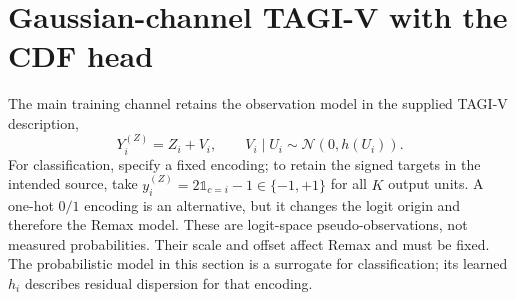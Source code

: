 \documentclass[letterpaper]{article}
\newcommand{\Normal}{\mathcal N}
\newcommand{\ind}{\mathbb 1}
\newcommand{\given}{\mid}
\begin{document}
\section{Gaussian-channel TAGI-V with the CDF head}\label{S:gaussian}
The main training channel retains the observation model in the supplied TAGI-V description,
\begin{equation}
Y_i^{(Z)}=Z_i+V_i,\qquad V_i\given U_i\sim\Normal(0,h(U_i)).
\label{E:gausschannel}
\end{equation}
For classification, specify a fixed encoding; to retain the signed targets in the intended source, take $y_i^{(Z)}=2\ind_{c=i}-1\in\{-1,+1\}$ for all $K$ output units. A one-hot $0/1$ encoding is an alternative, but it changes the logit origin and therefore the Remax model. These are logit-space pseudo-observations, not measured probabilities. Their scale and offset affect Remax and must be fixed. The probabilistic model in this section is a surrogate for classification; its learned $h_i$ describes residual dispersion for that encoding.
\end{document}
